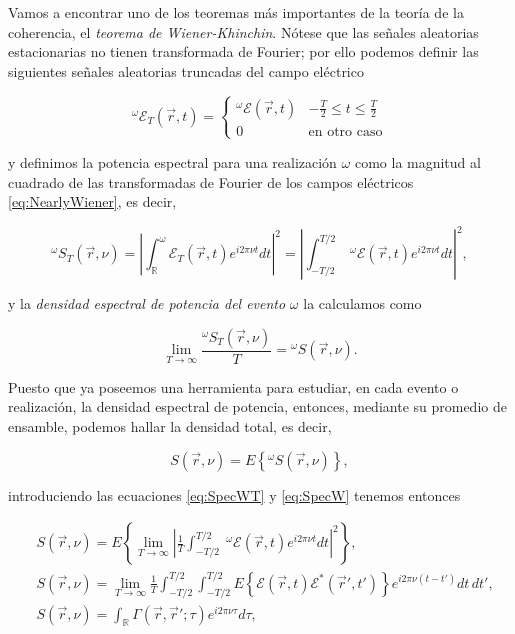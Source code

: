 		Vamos a encontrar uno de los teoremas más importantes de la teoría de la coherencia, el \textit{teorema de Wiener-Khinchin}. Nótese que las señales aleatorias estacionarias no tienen transformada de Fourier; por ello podemos definir las siguientes señales aleatorias truncadas del campo eléctrico

		\begin{equation}\label{eq:NearlyWiener}
			^\omega \mathcal{E}_T (\vec{r},t) = \left\{
			\begin{matrix}
				^\omega\mathcal{E}(\vec{r},t) & -\frac{T}{2}\leq t \leq \frac{T}{2}\\
				0 & \text{en otro caso}
			\end{matrix} \right.
		\end{equation}

		y definimos la potencia espectral para una realización $\omega$ como la magnitud al cuadrado de las transformadas de Fourier de los campos eléctricos \eqref{eq:NearlyWiener}, es decir,

		\begin{equation}\label{eq:SpecWT}
			^\omega S_T (\vec{r},\nu) = \left| \int_\mathbb{R} ^\omega \mathcal{E}_T(\vec{r},t)e^{i2\pi\nu t}dt \right|^2 = \left| \int_{-T/2}^{T/2}\;^\omega \mathcal{E}(\vec{r},t)e^{i2\pi\nu t}dt \right|^2,
		\end{equation}

		y la \textit{densidad espectral de potencia del evento} $\omega$ la calculamos como

		\begin{equation}\label{eq:SpecW}
			\lim_{T \to \infty} \frac{^\omega S_T(\vec{r},\nu)}{T} = {}^\omega S(\vec{r},\nu).
		\end{equation}

		Puesto que ya poseemos una herramienta para estudiar, en cada evento o realización, la densidad espectral de potencia, entonces, mediante su promedio de ensamble, podemos hallar la densidad total, es decir,

		\begin{equation}
			S(\vec{r},\nu) = E\left\{^\omega S(\vec{r},\nu)\right\},
		\end{equation}

		introduciendo las ecuaciones \eqref{eq:SpecWT} y \eqref{eq:SpecW} tenemos entonces

		\begin{align}
			& S(\vec{r},\nu) = E\left\{ \lim_{T \to \infty} \left| \frac{1}{T} \int_{-T/2}^{T/2}\;^\omega \mathcal{E}(\vec{r},t)e^{i2\pi\nu t}dt \right|^2 \right\},\\
			& S(\vec{r},\nu) = \lim_{T \to \infty} \frac{1}{T}  \int_{-T/2}^{T/2}\int_{-T/2}^{T/2} E \left\{ \mathcal{E}(\vec{r},t)\mathcal{E}^*(\vec{r}',t') \right\} e^{i2\pi\nu(t-t')}dt\,dt',\\
			& S(\vec{r},\nu) = \int_{\mathbb{R}}\Gamma(\vec{r},\vec{r}';\tau)e^{i2\pi\nu \tau}d\tau,
		\end{align}

